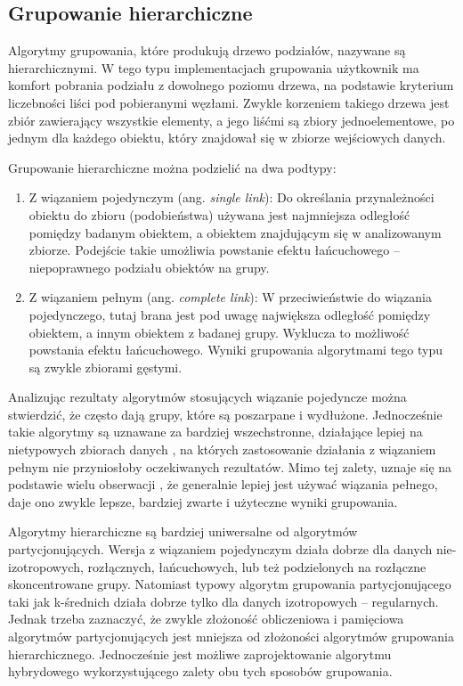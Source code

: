 \documentclass{article}
\begin{document}
\subsection{Grupowanie hierarchiczne} 
\label{subsec:grupHier}
Algorytmy grupowania, które produkują drzewo podziałów, nazywane są hierarchicznymi. W tego typu implementacjach grupowania użytkownik ma komfort pobrania podziału z dowolnego poziomu drzewa, na podstawie kryterium liczebności liści pod pobieranymi węzłami. Zwykle korzeniem takiego drzewa jest zbiór zawierający wszystkie elementy, a jego liśćmi są zbiory jednoelementowe, po jednym dla każdego obiektu, który znajdował się w zbiorze wejściowych danych.

Grupowanie hierarchiczne można podzielić na dwa podtypy:

\begin{enumerate}
	\item Z wiązaniem pojedynczym (ang. \textit{single link}):
	Do określania przynależności obiektu do zbioru (podobieństwa) używana jest najmniejsza odległość pomiędzy badanym obiektem, a obiektem znajdującym się w analizowanym zbiorze. Podejście takie umożliwia powstanie efektu łańcuchowego – niepoprawnego podziału obiektów na grupy.
	\item Z wiązaniem pełnym (ang. \textit{complete link}): 
	W przeciwieństwie do wiązania pojedynczego, tutaj brana jest pod uwagę największa odległość pomiędzy obiektem, a innym obiektem z badanej grupy. Wyklucza to możliwość powstania efektu łańcuchowego. Wyniki grupowania algorytmami tego typu są zwykle zbiorami gęstymi.
\end{enumerate}

Analizując rezultaty algorytmów stosujących wiązanie pojedyncze można stwierdzić, że często dają grupy, które są poszarpane i wydłużone. Jednocześnie takie algorytmy są uznawane za bardziej wszechstronne, działające lepiej na nietypowych zbiorach danych , na których zastosowanie działania z wiązaniem pełnym nie przyniosłoby oczekiwanych rezultatów. Mimo tej zalety, uznaje się na podstawie wielu obserwacji , że generalnie lepiej jest używać wiązania pełnego, daje ono zwykle lepsze, bardziej zwarte i użyteczne wyniki grupowania.

Algorytmy hierarchiczne są bardziej uniwersalne od algorytmów partycjonujących. Wersja z wiązaniem pojedynczym działa dobrze dla danych nie-izotropowych, rozłącznych, łańcuchowych, lub też podzielonych na rozłączne skoncentrowane grupy. Natomiast typowy algorytm grupowania partycjonującego taki jak k-średnich działa dobrze tylko dla danych izotropowych – regularnych. Jednak trzeba zaznaczyć, że zwykle złożoność obliczeniowa i pamięciowa algorytmów partycjonujących jest mniejsza od złożoności algorytmów grupowania hierarchicznego. Jednocześnie jest możliwe zaprojektowanie algorytmu hybrydowego wykorzystującego zalety obu tych sposobów grupowania. 
\end{document}
